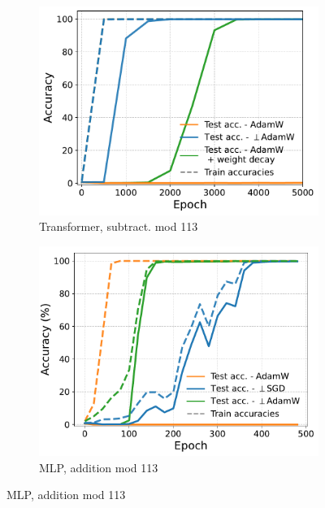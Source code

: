 \begin{figure}[t]
\begin{subfigure}[t]{.32\textwidth}
    \includegraphics[width=\linewidth]{grokking_iclr_arxiv/figures/transformer_orthogonal.pdf}
    \caption{\vspace{-1.5mm}Transformer, subtract. mod 113}
    \label{fig:orthogonal_gradient}
\end{subfigure}
\hfill
\begin{subfigure}[t]{.32\textwidth}
    \includegraphics[width=\linewidth]{grokking_iclr_arxiv/figures/mlp_orth_gradients.pdf}
    \caption{\vspace{-1.5mm}MLP, addition mod 113}
\label{fig:orthogonal_gradient_mlp}
\end{subfigure}

\end{figure}
